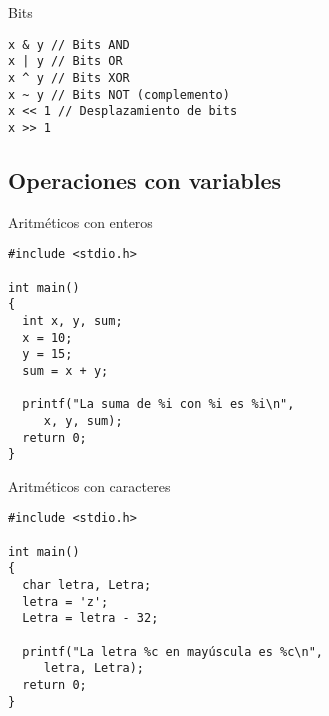 \documentclass[xcolor={usenames,svgnames,dvipsnames}, aspectratio=169]{beamer}
\begin{document}
\begin{frame}[label={sec:orgd4f4283},fragile]{Bits}
 \lstset{language=C,label= ,caption= ,captionpos=b,numbers=none}
\begin{lstlisting}
x & y // Bits AND
x | y // Bits OR
x ^ y // Bits XOR
x ~ y // Bits NOT (complemento)
x << 1 // Desplazamiento de bits
x >> 1
\end{lstlisting}
\end{frame}

\subsection{Operaciones con variables}
\label{sec:org89d7b2b}
\begin{frame}[label={sec:orgcc5d7d0},fragile]{Aritméticos con enteros}
 \lstset{language=C,label= ,caption= ,captionpos=b,numbers=none}
\begin{lstlisting}
#include <stdio.h>

int main()
{
  int x, y, sum;
  x = 10;
  y = 15;
  sum = x + y;

  printf("La suma de %i con %i es %i\n",
	 x, y, sum);
  return 0;
}
\end{lstlisting}
\end{frame}


\begin{frame}[label={sec:orgb242860},fragile]{Aritméticos con caracteres}
 \lstset{language=C,label= ,caption= ,captionpos=b,numbers=none}
\begin{lstlisting}
#include <stdio.h>

int main()
{
  char letra, Letra;
  letra = 'z';
  Letra = letra - 32;

  printf("La letra %c en mayúscula es %c\n",
	 letra, Letra);
  return 0;
}
\end{lstlisting}
\end{frame}
\end{document}

